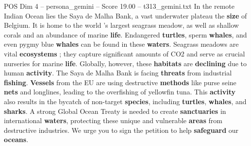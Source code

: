 \begin{textsample}{POS Dim 4 – persona\_gemini – Score 19.00 – t313\_gemini.txt}  \label{ex:f4_pos_041}
In the remote Indian Ocean lies the Saya de Malha Bank, a vast underwater plateau the \textbf{size} of Belgium.
It is home to the world 's largest seagrass meadow, as well as shallow corals and an abundance of marine \textbf{life}.
Endangered \textbf{turtles}, sperm \textbf{whales}, and even pygmy blue \textbf{whales} can be found in these \textbf{waters}.
Seagrass meadows are vital \textbf{ecosystems} ; they capture significant amounts of CO2 and serve as crucial nurseries for marine \textbf{life}.
Globally, however, these \textbf{habitats} are \textbf{declining} due to human \textbf{activity}.
The Saya de Malha Bank is facing \textbf{threats} from industrial \textbf{fishing}. \textbf{Vessels} from the EU are using destructive \textbf{methods} like purse seine \textbf{nets} and longlines, leading to the overfishing of yellowfin tuna.
This \textbf{activity} also results in the bycatch of non-target \textbf{species}, including \textbf{turtles}, \textbf{whales}, and \textbf{sharks}.
A strong Global Ocean Treaty is needed to create \textbf{sanctuaries} in international \textbf{waters}, protecting these unique and vulnerable \textbf{areas} from destructive industries.
We urge you to sign the petition to help \textbf{safeguard} our \textbf{oceans}.

\end{textsample}
